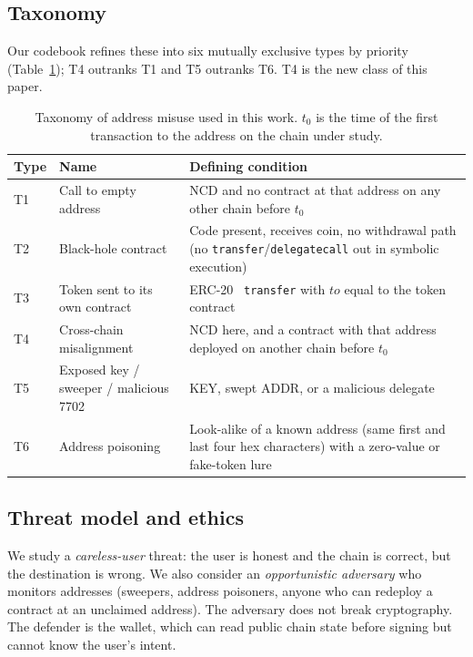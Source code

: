 \documentclass[runningheads]{llncs}
\newcommand{\NCD}{\textsf{NCD}}
\begin{document}
\subsection{Taxonomy}
Our codebook refines these into six mutually exclusive types by priority
(Table~\ref{tab:taxonomy}); T4 outranks T1 and T5 outranks T6. T4 is the new
class of this paper.
\begin{table}[t]
\caption{Taxonomy of address misuse used in this work. $t_0$ is the time of the
first transaction to the address on the chain under study.}
\label{tab:taxonomy}
\centering
\begin{tabular}{@{}l>{\raggedright\arraybackslash}p{3.1cm}>{\raggedright\arraybackslash}p{6.4cm}@{}}
\toprule
Type & Name & Defining condition\\
\midrule
T1 & Call to empty address & \NCD{} and no contract at that address on any other
chain before $t_0$\\
T2 & Black-hole contract & Code present, receives coin, no withdrawal path
(no \texttt{transfer}/\texttt{delegatecall} out in symbolic execution)\\
T3 & Token sent to its own contract & ERC-20~\cite{eip20} \texttt{transfer} with
$\mathit{to}$ equal to the token contract\\
T4 & Cross-chain misalignment & \NCD{} here, and a contract with that address
deployed on another chain before $t_0$\\
T5 & Exposed key / sweeper / malicious 7702 & KEY, swept ADDR, or a malicious
delegate\\
T6 & Address poisoning & Look-alike of a known address (same first and last four
hex characters) with a zero-value or fake-token lure\\
\bottomrule
\end{tabular}
\end{table}

\subsection{Threat model and ethics}
We study a \emph{careless-user} threat: the user is honest and the chain is
correct, but the destination is wrong. We also consider an \emph{opportunistic
adversary} who monitors addresses (sweepers, address poisoners, anyone who can
redeploy a contract at an unclaimed address). The adversary does not break
cryptography. The defender is the wallet, which can read public chain state
before signing but cannot know the user's intent.
\end{document}
